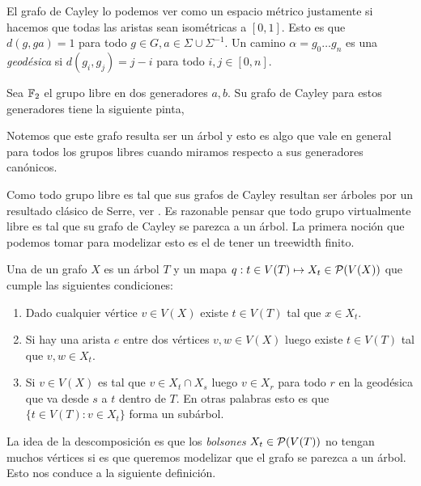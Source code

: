 \documentclass[tesis.tex]{subfiles}
\begin{document}
El grafo de Cayley lo podemos ver como un espacio métrico justamente si hacemos que todas las aristas sean isométricas a $[0,1]$. 
Esto es que $d(g,ga) = 1$ para todo $g \in G, a \in \Sigma \cup \Sigma^{-1}$. 
Un camino $\alpha = g_0 \dots g_n$ es una \emph{geodésica} si $d(g_i,g_j) = j-i$ para todo $i,j \in [0,n]$.

\begin{ej}
	Sea $\Bbb F_2$ el grupo libre en dos generadores $a,b$. Su grafo de Cayley para estos generadores tiene la siguiente pinta,
	\bigskip
	
	
	 Notemos que este grafo resulta ser un árbol y esto es algo que vale en general para todos los grupos libres cuando miramos respecto a sus generadores canónicos.
\end{ej}

Como todo grupo libre es tal que sus grafos de Cayley resultan ser árboles por un resultado clásico de Serre, ver \cite{}.
Es razonable pensar que todo grupo virtualmente libre es tal que su grafo de Cayley se parezca a un árbol. 
La primera noción que podemos tomar para modelizar esto es el de tener un treewidth finito.

\begin{deff}\label{desc-arbol}
	 Una  de un grafo $X$ es un árbol $T$ y un mapa $q:t \in V(T) \mapsto X_t \in {\cal P}(V(X))$ que cumple las siguientes condiciones:
	\begin{enumerate}
		\item Dado cualquier vértice $v \in V(X)$ existe $t \in V(T)$ tal que $x \in X_t$. 
		\item Si hay una arista $e$ entre dos vértices $v,w \in V(X)$ luego existe $t \in V(T)$ tal que $v,w \in X_t$.
		\item Si $v \in V(X)$ es tal que $v \in X_t \cap X_s$ luego $v \in X_r$ para todo $r$ en la geodésica que va desde $s$ a $t$ dentro de $T$. En otras palabras esto es que $\{ t \in V(T) :  v \in X_t \}$ forma un subárbol. 
	\end{enumerate} 
\end{deff}
\smallskip

La idea de la descomposición es que los \emph{bolsones} $X_t \in {\cal P}(V(T))$ no tengan muchos vértices si es que queremos modelizar que el grafo se parezca a un árbol. Esto nos conduce a la siguiente definición.
\end{document}
